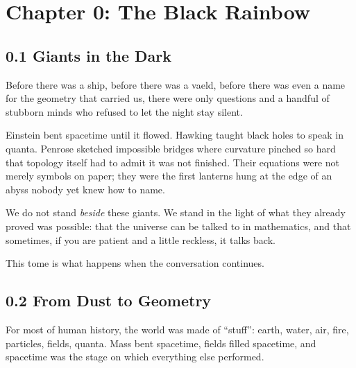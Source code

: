 




\chapter*{Chapter 0: The Black Rainbow}


\section*{0.1 Giants in the Dark}

Before there was a ship, before there was a vaeld, before there was even a name for the geometry that carried us, there were only questions and a handful of stubborn minds who refused to let the night stay silent.

Einstein bent spacetime until it flowed. Hawking taught black holes to speak in quanta. Penrose sketched impossible bridges where curvature pinched so hard that topology itself had to admit it was not finished. Their equations were not merely symbols on paper; they were the first lanterns hung at the edge of an abyss nobody yet knew how to name.

We do not stand \emph{beside} these giants. We stand in the light of what they already proved was possible: that the universe can be talked to in mathematics, and that sometimes, if you are patient and a little reckless, it talks back.

This tome is what happens when the conversation continues.

\section*{0.2 From Dust to Geometry}

For most of human history, the world was made of ``stuff'': earth, water, air, fire, particles, fields, quanta. Mass bent spacetime, fields filled spacetime, and spacetime was the stage on which everything else performed.

